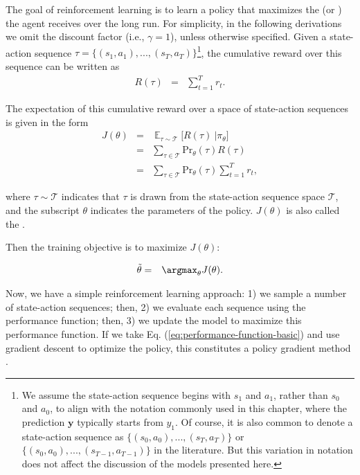 The goal of reinforcement learning is to learn a policy that maximizes the  (or ) the agent receives over the long run. For simplicity, in the following derivations we omit the discount factor (i.e., $\gamma = 1$), unless otherwise specified.  Given a state-action sequence $\tau = \{(s_1,a_1),...,(s_T,a_T)\}$\footnote{We assume the state-action sequence begins with $s_1$ and $a_1$, rather than $s_0$ and $a_0$, to align with the notation commonly used in this chapter, where the prediction $\mathbf{y}$ typically starts from $y_1$. Of course, it is also common to denote a state-action sequence as $\{(s_0,a_0),...,(s_T,a_T)\}$ or $\{(s_0,a_0),...,(s_{T-1},a_{T-1})\}$ in the literature. But this variation in notation does not affect the discussion of the models presented here.}, the cumulative reward  over this sequence can be written as
\begin{eqnarray}
R(\tau) & = & \sum_{t=1}^{T} r_t. \label{eq:rl-sequence-reward}
\end{eqnarray}

The expectation of this cumulative reward over a space of state-action sequences is given in the form
\begin{eqnarray}
J(\theta) & = & \mathop{\mathbb{E}}_{\tau \sim \mathcal{T}} \Big[ R(\tau) \ \big | \pi_{\theta} \Big] \nonumber \\
          & = & \sum_{\tau \in \mathcal{T}} \mathrm{Pr}_{\theta}(\tau) R(\tau) \nonumber \\
          & = & \sum_{\tau \in \mathcal{T}} \mathrm{Pr}_{\theta}(\tau) \sum_{t=1}^{T} r_t, \label{eq:performance-function-basic}
\end{eqnarray}

\noindent where $\tau \sim \mathcal{T}$ indicates that $\tau$ is drawn from the state-action sequence space $\mathcal{T}$, and the subscript $\theta$ indicates the parameters of the policy. $J(\theta)$ is also called the .

Then the training objective is to maximize $J(\theta)$:

\begin{eqnarray}
\tilde{\theta} & = & \argmax_{\theta} J(\theta). \label{eq:rl-optimize-j-theta}
\end{eqnarray}

Now, we have a simple reinforcement learning approach: 1) we sample a number of state-action sequences; then, 2) we evaluate each sequence using the performance function; then, 3) we update the model to maximize this performance function. If we take Eq. (\ref{eq:performance-function-basic}) and use gradient descent to optimize the policy, this constitutes a policy gradient method \cite{williams:1992simple}.

